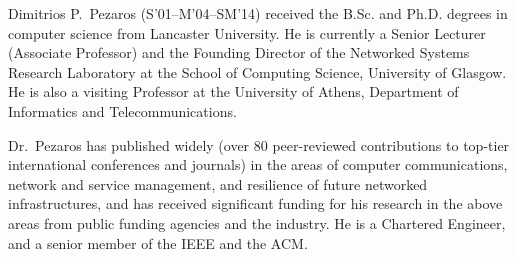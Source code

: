 \documentclass[10pt, times, comsoc]{IEEEtran}
\begin{document}
\begin{IEEEbiography}
	{Dimitrios P.\ Pezaros}
	(S’01–M’04–SM’14) received the B.Sc. and Ph.D. degrees in computer science from Lancaster University. He is currently a Senior Lecturer (Associate Professor) and the Founding Director of the Networked Systems Research Laboratory at the School of Computing Science, University of Glasgow. He is also a visiting Professor at the University of Athens, Department of Informatics and Telecommunications.
	
	Dr.\ Pezaros has published widely (over 80 peer-reviewed contributions to top-tier international conferences and journals) in the areas of computer communications, network and service management, and resilience of future networked infrastructures, and has received significant funding for his research in the above areas from public funding agencies and the industry. He is a Chartered Engineer, and a senior member of the IEEE and the ACM.
	
\end{IEEEbiography}
\end{document}
